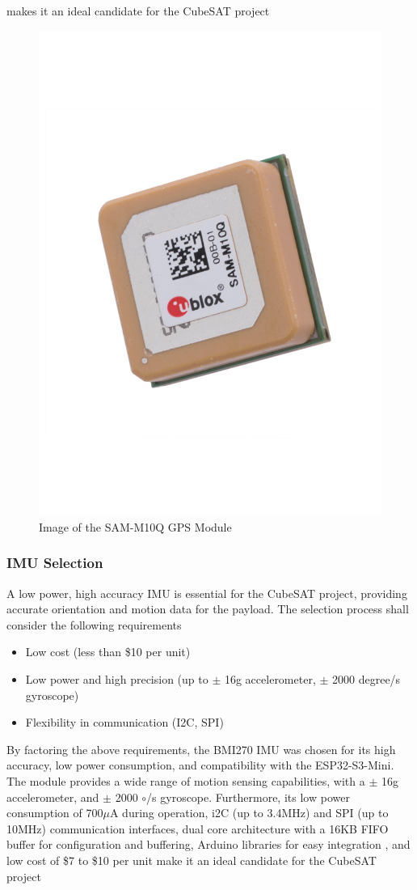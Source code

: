 \documentclass{report}
\begin{document}
                    makes it an ideal candidate for the CubeSAT project \cite{sammdatasheet}
                    \begin{figure}[H]
                        \centering
                        \includegraphics[width=0.3\linewidth, angle=290]{figures/GPS_IMG.pdf}
                        \caption{Image of the SAM-M10Q GPS Module}
                        \label{fig:gps_img}
                    \end{figure}
                \subsubsection{IMU Selection}
                    A low power, high accuracy IMU is essential for the CubeSAT project, providing
                    accurate orientation and motion data for the payload. The selection process shall
                    consider the following requirements
                    \begin{itemize}
                        \item Low cost (less than \$10 per unit)
                        \item Low power and high precision (up to $\pm$ 16g accelerometer, $\pm$ 2000 degree/s gyroscope)
                        \item Flexibility in communication (I2C, SPI)
                    \end{itemize}
                    By factoring the above requirements, the BMI270 IMU was chosen for its high accuracy,
                    low power consumption, and compatibility with the ESP32-S3-Mini. The module provides
                    a wide range of motion sensing capabilities, with a $\pm$ 16g accelerometer, and $\pm$ 2000 $\circ$/s gyroscope.
                    Furthermore, its low power consumption of 700$\mu$A during operation, i2C (up to 3.4MHz) and SPI (up to 10MHz) communication
                    interfaces, dual core architecture with a 16KB FIFO buffer for configuration and buffering,
                    Arduino libraries for easy integration \cite{bosch2023}, and low cost of \$7 to \$10 per unit make it an ideal candidate for the CubeSAT project \cite{bosch2023}
\end{document}
